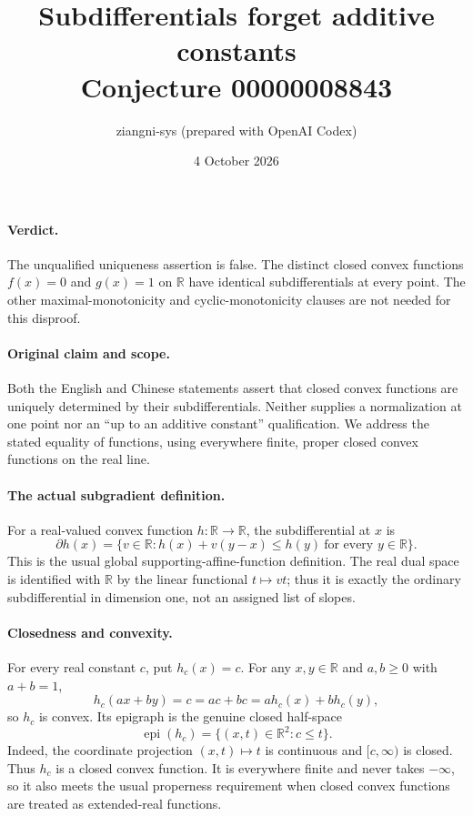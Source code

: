 \documentclass[11pt]{article}
\title{Subdifferentials forget additive constants\\Conjecture 00000008843}
\author{ziangni-sys (prepared with OpenAI Codex)}
\date{4 October 2026}
\begin{document}
\maketitle
\paragraph{Verdict.} The unqualified uniqueness assertion is false. The distinct closed convex functions $f(x)=0$ and $g(x)=1$ on $\mathbb R$ have identical subdifferentials at every point. The other maximal-monotonicity and cyclic-monotonicity clauses are not needed for this disproof.

\paragraph{Original claim and scope.} Both the English and Chinese statements assert that closed convex functions are uniquely determined by their subdifferentials. Neither supplies a normalization at one point nor an ``up to an additive constant'' qualification. We address the stated equality of functions, using everywhere finite, proper closed convex functions on the real line.

\paragraph{The actual subgradient definition.} For a real-valued convex function $h:\mathbb R\to\mathbb R$, the subdifferential at $x$ is
\[
\partial h(x)=\{v\in\mathbb R:
  h(x)+v(y-x)\leq h(y)\ \text{for every }y\in\mathbb R\}.
\]
This is the usual global supporting-affine-function definition. The real dual space is identified with $\mathbb R$ by the linear functional $t\mapsto vt$; thus it is exactly the ordinary subdifferential in dimension one, not an assigned list of slopes.

\paragraph{Closedness and convexity.} For every real constant $c$, put $h_c(x)=c$. For any $x,y\in\mathbb R$ and $a,b\geq0$ with $a+b=1$,
\[
h_c(ax+by)=c=ac+bc=ah_c(x)+bh_c(y),
\]
so $h_c$ is convex. Its epigraph is the genuine closed half-space
\[
\operatorname{epi}(h_c)=\{(x,t)\in\mathbb R^2:c\leq t\}.
\]
Indeed, the coordinate projection $(x,t)\mapsto t$ is continuous and $[c,\infty)$ is closed. Thus $h_c$ is a closed convex function. It is everywhere finite and never takes $-\infty$, so it also meets the usual properness requirement when closed convex functions are treated as extended-real functions.
\end{document}
